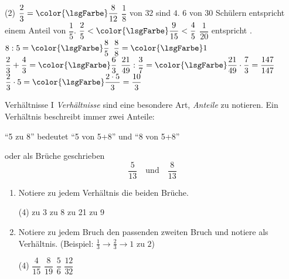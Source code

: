 \documentclass[lerntheke,12pt,a5paper,landscape]{arbeitsblatt}
\def\clrLsg{\color{\lsgFarbe}}
\begin{document}
	\begin{loesungskarte}
		\begin{tasks}(2)
			\task $\dfrac{2}{3} = \clrLsg\dfrac{8}{12}$
			\task $\dfrac{1}{8}$ von $32$ sind \clrLsg$4$.
			\task $6$ von $30$ Schülern entspricht einem Anteil von \clrLsg$\dfrac{1}{5}$.
			\task $\dfrac{2}{5} < \clrLsg\dfrac{9}{15} < \dfrac{4}{5}$
			\task $\dfrac{1}{20}$ entspricht \clrLsg{}.
			\task $8: 5 =\clrLsg\dfrac{8}{5}$
			\task $\dfrac{8}{8} = \clrLsg 1$
			\task $\dfrac{2}{3} + \dfrac{4}{3} = \clrLsg\dfrac{6}{3}$
			\task $\dfrac{21}{49}: \dfrac{3}{7} = \clrLsg\dfrac{21}{49}\cdot \dfrac{7}{3} = \dfrac{147}{147}$
			\task $\dfrac{2}{3}\cdot 5 = \clrLsg\dfrac{2\cdot 5}{3} = \dfrac{10}{3}$
		\end{tasks}
	\end{loesungskarte}

	\begin{karte1}{Verhältnisse I}
		\emph{Verhältnisse} sind eine besondere Art, \emph{Anteile} zu notieren. Ein Verhältnis beschreibt immer zwei Anteile:
		\begin{center}
			\enquote{5 zu 8} bedeutet \enquote{5 von 5+8} und \enquote{8 von 5+8}
		\end{center}
		oder als Brüche geschrieben
		\[ \frac{5}{13} \quad\text{und}\quad \frac{8}{13} \]

		\begin{enumerate}
			\item Notiere zu jedem Verhältnis die beiden Brüche.
				\begin{tasks}(4)
					\task 7 zu 3
					\task 4 zu 8
					\task 14 zu 21
					\task 13 zu 9
				\end{tasks}

			\item Notiere zu jedem Bruch den passenden zweiten Bruch und notiere als Verhältnis. (Beispiel: $\tfrac{1}{3} \rightarrow \tfrac{2}{3} \rightarrow \text{1 zu 2}$)
				\begin{tasks}(4)
					\task $\dfrac{4}{15}$
					\task $\dfrac{8}{19}$
					\task $\dfrac{5}{6}$
					\task $\dfrac{12}{32}$
				\end{tasks}
		\end{enumerate}
	\end{karte1}
\end{document}
